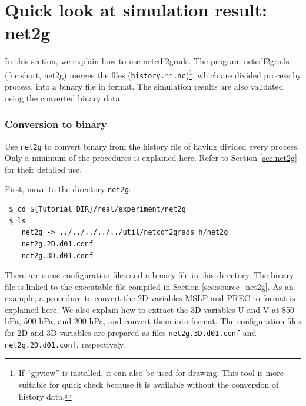 \section{Quick look at simulation result: net2g} \label{sec:quicklook}

In this section, we explain how to use netcdf2grads. The program netcdf2grads (for short, net2g) merges the \netcdf files (\verb|history.**.nc|)\footnote{If ``gpview'' is installed, it can also be used for drawing. This tool is more suitable for quick check  because it is available without the conversion of history data.},  which are divided process by process, into a binary file in \grads format. The simulation results are also validated using the converted \grads binary data.

\subsubsection{Conversion to \grads binary}
Use \verb|net2g| to convert \grads binary from the history file of \netcdf having divided every process.  Only a minimum of the procedures is explained here.  Refer to Section \ref{sec:net2g} for their detailed use.

First, move to the directory \verb|net2g|:
\begin{verbatim}
 $ cd ${Tutorial_DIR}/real/experiment/net2g
 $ ls
    net2g -> ../../../../../util/netcdf2grads_h/net2g
    net2g.2D.d01.conf
    net2g.3D.d01.conf
\end{verbatim}
There are some configuration files and a binary file in this directory.  The binary file is linked to the executable file compiled in Section \ref{sec:source_net2g}. As an example,  a procedure to convert the 2D variables MSLP and PREC to \grads format is explained here. We also explain how to extract the 3D variables U and V at 850 hPa, 500 hPa, and 200 hPa, and convert them into \grads format.  The configuration files for 2D and 3D variables  are prepared as files \verb|net2g.3D.d01.conf| and \verb|net2g.2D.d01.conf|, respectively. 
 
